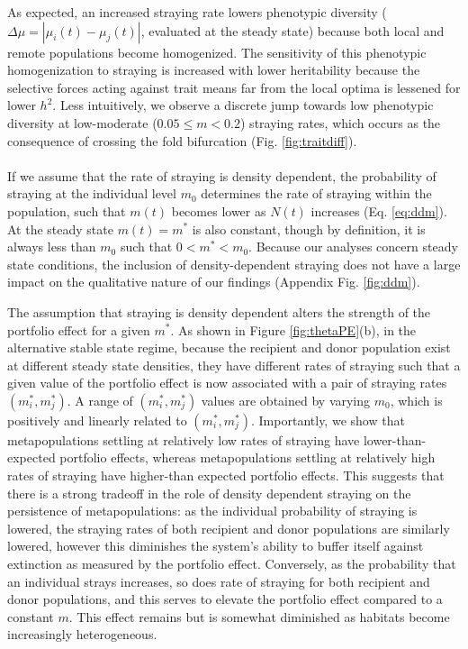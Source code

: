 \documentclass[twocolumn,preprintnumbers,amsmath,amssymb,superscriptaddress]{revtex4}
\begin{document}
As expected, an increased straying rate lowers phenotypic diversity ($\Delta \mu = |\mu_i(t)-\mu_j(t)|$, evaluated at the steady state) because both local and remote populations become homogenized.
The sensitivity of this phenotypic homogenization to straying is increased with lower heritability because the selective forces acting against trait means far from the local optima is lessened for lower $h^2$.
Less intuitively, we observe a discrete jump towards low phenotypic diversity at low-moderate ($0.05 \leq m < 0.2$) straying rates, which occurs as the consequence of crossing the fold bifurcation (Fig. \ref{fig:traitdiff}).
\\


\\
\noindent If we assume that the rate of straying is density dependent, the probability of straying at the individual level $m_0$ determines the rate of straying within the population, such that $m(t)$ becomes lower as $N(t)$ increases (Eq. \ref{eq:ddm}).
At the steady state $m(t)=m^*$ is also constant, though by definition, it is always less than $m_0$ such that $0 < m^* < m_0$.
Because our analyses concern steady state conditions, the inclusion of density-dependent straying does not have a large impact on the qualitative nature of our findings (Appendix Fig. \ref{fig:ddm}).

The assumption that straying is density dependent alters the strength of the portfolio effect for a given $m^*$.
As shown in Figure \ref{fig:thetaPE}(b), in the alternative stable state regime, because the recipient and donor population exist at different steady state densities, they have different rates of straying such that a given value of the portfolio effect is now associated with a pair of straying rates $(m_i^*,m_j^*)$.
A range of $(m_i^*,m_j^*)$ values are obtained by varying $m_0$, which is positively and linearly related to $(m_i^*,m_j^*)$.
Importantly, we show that metapopulations settling at relatively low rates of straying have lower-than-expected portfolio effects, whereas metapopulations settling at relatively high rates of straying have higher-than expected portfolio effects.
This suggests that there is a strong tradeoff in the role of density dependent straying on the persistence of metapopulations: as the individual probability of straying is lowered, the straying rates of both recipient and donor populations are similarly lowered, however this diminishes the system's ability to buffer itself against extinction as measured by the portfolio effect.
Conversely, as the probability that an individual strays increases, so does rate of straying for both recipient and donor populations, and this serves to elevate the portfolio effect compared to a constant $m$.
This effect remains but is somewhat diminished as habitats become increasingly heterogeneous.
\\
\end{document}
